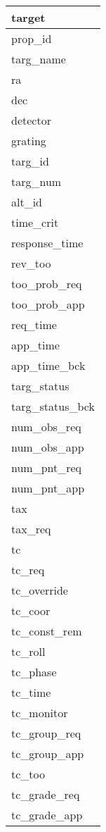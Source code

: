 \documentclass{article}
\begin{document}

\begin{tabular}{|l|} \hline
\textbf{target} \\ \hline
prop\_id \\ \hline
targ\_name \\ \hline
ra \\ \hline
dec \\ \hline
detector \\ \hline
grating \\ \hline
targ\_id \\ \hline
targ\_num \\ \hline
alt\_id \\ \hline
time\_crit \\ \hline
response\_time \\ \hline
rev\_too \\ \hline
too\_prob\_req \\ \hline
too\_prob\_app \\ \hline
req\_time \\ \hline
app\_time \\ \hline
app\_time\_bck \\ \hline
targ\_status \\ \hline
targ\_status\_bck \\ \hline
num\_obs\_req \\ \hline
num\_obs\_app \\ \hline
num\_pnt\_req \\ \hline
num\_pnt\_app \\ \hline
tax \\ \hline
tax\_req \\ \hline
tc \\ \hline
tc\_req \\ \hline
tc\_override \\ \hline
tc\_coor \\ \hline
tc\_const\_rem \\ \hline
tc\_roll \\ \hline
tc\_phase \\ \hline
tc\_time \\ \hline
tc\_monitor \\ \hline
tc\_group\_req \\ \hline
tc\_group\_app \\ \hline
tc\_too \\ \hline
tc\_grade\_req \\ \hline
tc\_grade\_app \\ \hline
\end{tabular}
\end{document}
